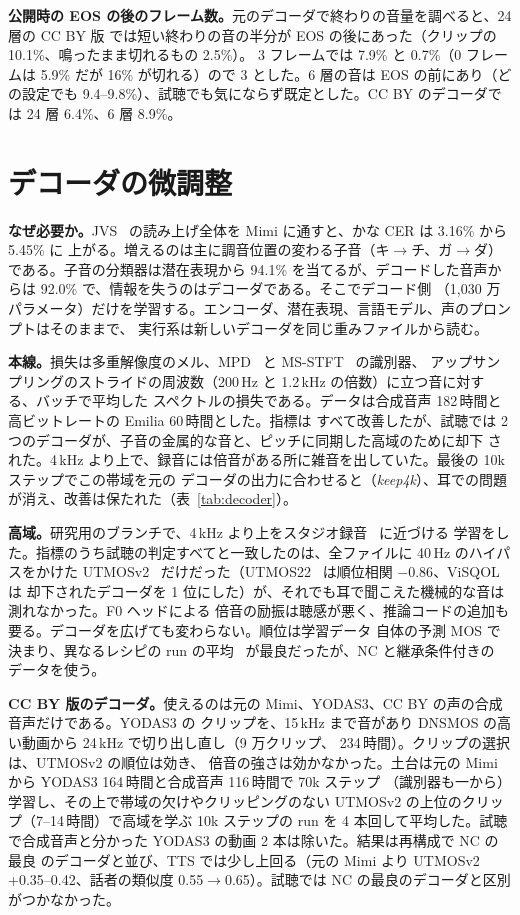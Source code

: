\documentclass[10pt,a4paper,twocolumn]{article}
\begin{document}
\textbf{公開時の EOS の後のフレーム数。}元のデコーダで終わりの音量を調べると、24 層の CC BY 版
では短い終わりの音の半分が EOS の後にあった（クリップの 10.1\%、鳴ったまま切れるもの 2.5\%）。
3 フレームでは 7.9\% と 0.7\%（0 フレームは 5.9\% だが 16\% が切れる）ので 3 とした。6 層の音は
EOS の前にあり（どの設定でも 9.4--9.8\%）、試聴でも気にならず既定とした。CC BY のデコーダで
は 24 層 6.4\%、6 層 8.9\%。

\section{デコーダの微調整}\label{sec:decoder}
\textbf{なぜ必要か。}JVS~\cite{jvs} の読み上げ全体を Mimi に通すと、かな CER は 3.16\% から 5.45\% に
上がる。増えるのは主に調音位置の変わる子音（キ$\to$チ、ガ$\to$ダ）である。子音の分類器は潜在表現から
94.1\% を当てるが、デコードした音声からは 92.0\% で、情報を失うのはデコーダである。そこでデコード側
（1,030 万パラメータ）だけを学習する。エンコーダ、潜在表現、言語モデル、声のプロンプトはそのままで、
実行系は新しいデコーダを同じ重みファイルから読む。

\textbf{本線。}損失は多重解像度のメル、MPD~\cite{hifigan} と MS-STFT~\cite{encodec} の識別器、
アップサンプリングのストライドの周波数（200\,Hz と 1.2\,kHz の倍数）に立つ音に対する、バッチで平均した
スペクトルの損失である。データは合成音声 182\,時間と高ビットレートの Emilia 60\,時間とした。指標は
すべて改善したが、試聴では 2 つのデコーダが、子音の金属的な音と、ピッチに同期した高域のために却下
された。4\,kHz より上で、録音には倍音がある所に雑音を出していた。最後の 10k ステップでこの帯域を元の
デコーダの出力に合わせると（\emph{keep4k}）、耳での問題が消え、改善は保たれた（表~\ref{tab:decoder}）。

\textbf{高域。}研究用のブランチで、4\,kHz より上をスタジオ録音~\cite{hificaptain,jvnv} に近づける
学習をした。指標のうち試聴の判定すべてと一致したのは、全ファイルに 40\,Hz のハイパスをかけた
UTMOSv2~\cite{utmosv2} だけだった（UTMOS22~\cite{utmos} は順位相関 $-0.86$、ViSQOL~\cite{visqol} は
却下されたデコーダを 1 位にした）が、それでも耳で聞こえた機械的な音は測れなかった。F0 ヘッドによる
倍音の励振は聴感が悪く、推論コードの追加も要る。デコーダを広げても変わらない。順位は学習データ
自体の予測 MOS で決まり、異なるレシピの run の平均~\cite{soups} が最良だったが、NC と継承条件付きの
データを使う。

\textbf{CC BY 版のデコーダ。}使えるのは元の Mimi、YODAS3、CC BY の声の合成音声だけである。YODAS3 の
クリップを、15\,kHz まで音があり DNSMOS の高い動画から 24\,kHz で切り出し直し（9 万クリップ、
234\,時間）。クリップの選択は、UTMOSv2 の順位は効き、
倍音の強さは効かなかった。土台は元の Mimi から YODAS3 164\,時間と合成音声 116\,時間で 70k ステップ
（識別器も一から）学習し、その上で帯域の欠けやクリッピングのない UTMOSv2 の上位のクリップ（7--14\,時間）で高域を学ぶ 10k ステップの
run を 4 本回して平均した。試聴で合成音声と分かった YODAS3 の動画 2 本は除いた。結果は再構成で NC の最良
のデコーダと並び、TTS では少し上回る（元の Mimi より UTMOSv2 +0.35--0.42、話者の類似度
0.55$\to$0.65）。試聴では NC の最良のデコーダと区別がつかなかった。
\end{document}
